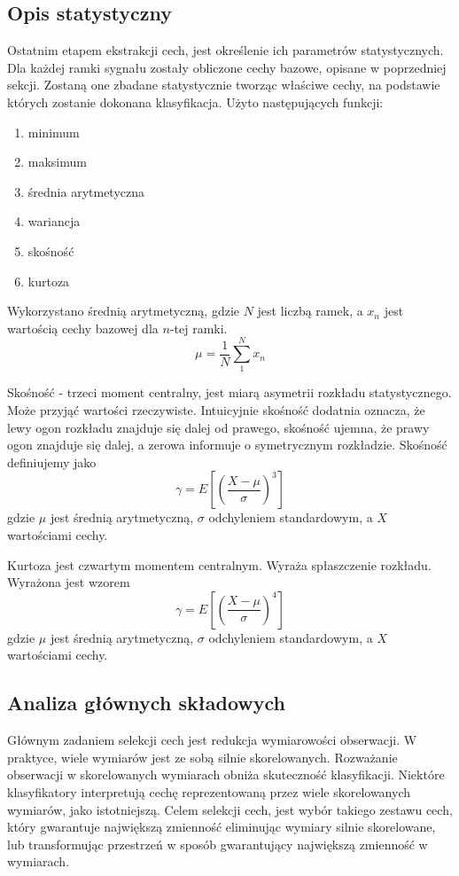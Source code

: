 \documentclass[a4paper,12pt,twoside,openany]{report}
\begin{document}
\subsection{Opis statystyczny}
Ostatnim etapem ekstrakcji cech, jest określenie ich parametrów statystycznych.
Dla każdej ramki sygnału zostały obliczone cechy bazowe, opisane w poprzedniej sekcji.
Zostaną one zbadane statystycznie tworząc właściwe cechy, na podstawie których zostanie dokonana klasyfikacja.
Użyto następujących funkcji:
\begin{enumerate}
	\item minimum 
	\item maksimum 
	\item średnia arytmetyczna
	\item wariancja 
	\item skośność
	\item kurtoza
\end{enumerate}
Wykorzystano średnią arytmetyczną, gdzie $N$ jest liczbą ramek, a $x_n$ jest wartością cechy bazowej dla $n$-tej ramki.
\begin{equation}
	\mu = \frac{1}{N}\sum_1^Nx_n
\end{equation}

Skośność - trzeci moment centralny, jest miarą asymetrii rozkładu statystycznego. 
Może przyjąć wartości rzeczywiste.
Intuicyjnie skośność dodatnia oznacza, że lewy ogon rozkładu znajduje się dalej od prawego,
skośność ujemna, że prawy ogon znajduje się dalej,
a zerowa informuje o symetrycznym rozkładzie.
Skośność definiujemy jako
\begin{equation}
	\gamma = E \left [ \left (  \frac{X - \mu}{ \sigma }   \right )^3 \right ]
\end{equation}
gdzie $\mu$ jest średnią arytmetyczną, $\sigma$ odchyleniem standardowym, a $X$ wartościami cechy.

Kurtoza jest czwartym momentem centralnym.
Wyraża spłaszczenie rozkładu. 
Wyrażona jest wzorem
\begin{equation}
	\gamma = E \left [ \left (  \frac{X - \mu}{ \sigma }   \right )^4 \right ]
\end{equation}
gdzie $\mu$ jest średnią arytmetyczną, $\sigma$ odchyleniem standardowym, a $X$ wartościami cechy.
\subsection{Analiza głównych składowych}\label{sec:pca}
Głównym zadaniem selekcji cech jest redukcja wymiarowości obserwacji.
W praktyce, wiele wymiarów jest ze sobą silnie skorelowanych.
Rozważanie obserwacji w skorelowanych wymiarach obniża skuteczność klasyfikacji.
Niektóre klasyfikatory interpretują cechę reprezentowaną przez wiele skorelowanych wymiarów, jako istotniejszą.
Celem selekcji cech, jest wybór takiego zestawu cech, który gwarantuje największą zmienność eliminując wymiary silnie skorelowane, 
lub transformując przestrzeń w sposób gwarantujący największą zmienność w wymiarach.
\end{document}
